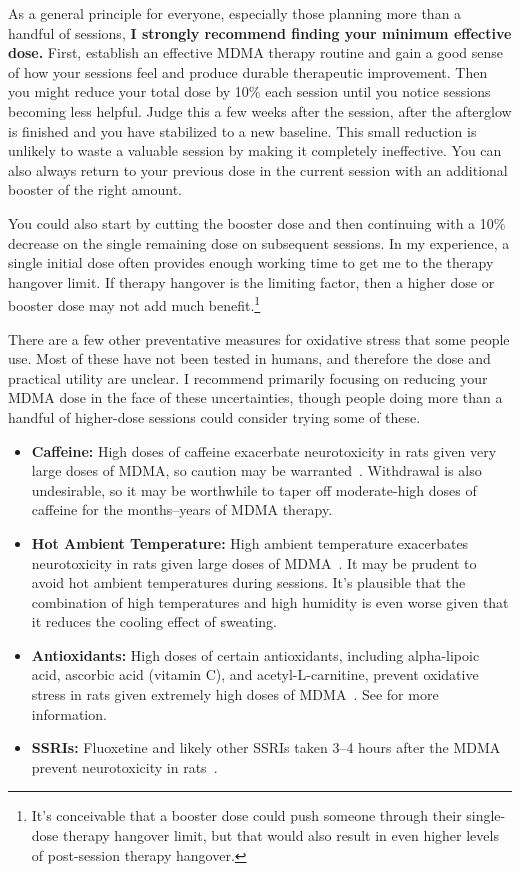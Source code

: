 \documentclass[11pt,oneside]{book}
\let\cite\parencite
\begin{document}
As a general principle for everyone, especially those planning more than a handful of sessions, \textbf{I strongly recommend finding your minimum effective dose.} First, establish an effective MDMA therapy routine and gain a good sense of how your sessions feel and produce durable therapeutic improvement. Then you might reduce your total dose by 10\% each session until you notice sessions becoming less helpful. Judge this a few weeks after the session, after the afterglow is finished and you have stabilized to a new baseline. This small reduction is unlikely to waste a valuable session by making it completely ineffective. You can also always return to your previous dose in the current session with an additional booster of the right amount.

You could also start by cutting the booster dose and then continuing with a 10\% decrease on the single remaining dose on subsequent sessions. In my experience, a single initial dose often provides enough working time to get me to the therapy hangover limit. If therapy hangover is the limiting factor, then a higher dose or booster dose may not add much benefit.\footnote{It's conceivable that a booster dose could push someone through their single-dose therapy hangover limit, but that would also result in even higher levels of post-session therapy hangover.}

There are a few other preventative measures for oxidative stress that some people use. Most of these have not been tested in humans, and therefore the dose and practical utility are unclear. I recommend primarily focusing on reducing your MDMA dose in the face of these uncertainties, though people doing more than a handful of higher-dose sessions could consider trying some of these.
\begin{itemize}
    \item \textbf{Caffeine:} High doses of caffeine exacerbate neurotoxicity in rats given very large doses of MDMA, so caution may be warranted~\cite{vanattouCaffeine}. Withdrawal is also undesirable, so it may be worthwhile to taper off moderate-high doses of caffeine for the months--years of MDMA therapy.
    \item \textbf{Hot Ambient Temperature:} High ambient temperature exacerbates neurotoxicity in rats given large doses of MDMA~\cite{baggottDamage}. It may be prudent to avoid hot ambient temperatures during sessions. It's plausible that the combination of high temperatures and high humidity is even worse given that it reduces the cooling effect of sweating.
    \item \textbf{Antioxidants:} High doses of certain antioxidants, including alpha-lipoic acid, ascorbic acid (vitamin C), and acetyl-L-carnitine, prevent oxidative stress in rats given extremely high doses of MDMA~\cite{aguirre1999alpha,shankaran2001ascorbic,alves2009acetyl}. See \textcite{baggottSupplements} for more information.
    \item \textbf{SSRIs:} Fluoxetine and likely other SSRIs taken 3--4 hours after the MDMA prevent neurotoxicity in rats~\cite{baggottDamage}.
\end{itemize}
\end{document}
